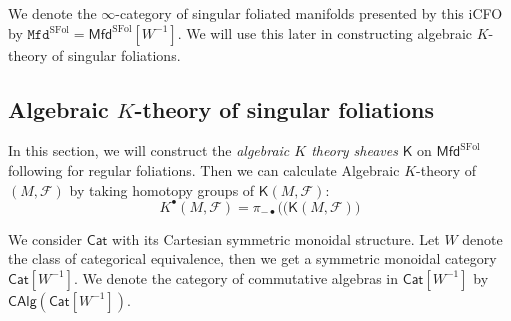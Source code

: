 \documentclass[12pt]{amsart}
\newtheorem{prop}[thm]{Proposition}
\theoremstyle{definition}
\theoremstyle{remark}
\numberwithin{equation}{section}
\newcommand{\CF}{{\mathcal F}}
\newcommand{\1}{{\mathbb{1}}}
\newcommand{\mfd}{\mathsf{Mfd}}
\newcommand{\calg}{\mathsf{CAlg}}
\newcommand{\sfol}{{\operatorname{SFol}}}
\newcommand{\cat}{\mathsf{Cat}}
\newcommand{\mfdi}{\mathtt{Mfd}}
\newcommand{\bt}{\bullet}
\begin{document}
We denote the $\infty$-category of singular foliated manifolds presented by this iCFO by $\mfdi^{\sfol} = \mfd^{\sfol}[W^{-1}]$. We will use this later in constructing algebraic $K$-theory of singular foliations.
\subsection{Algebraic $K$-theory of singular foliations}
In this section, we will construct the {\it algebraic $K$ theory sheaves}  $\mathsf{K}$ on $\mfd^{\sfol}$ following \cite{Bun18} for regular foliations. Then we can calculate Algebraic $K$-theory of $(M,\CF)$ by taking homotopy groups of $\mathsf{K}(M,\CF)$:
\begin{equation*}
    K^{\bt}(M,\CF) = \pi_{-\bt}(
    \big( \mathsf{K}(M,\CF)\big)
\end{equation*}

We consider $\cat$ with its Cartesian symmetric monoidal structure. Let $W$ denote the class of categorical equivalence, then we get a symmetric monoidal category $\cat[W^{-1}]$. We denote the category of commutative algebras in  $\cat[W^{-1}]$ by $\calg(\cat[W^{-1}])$. 
\end{document}
